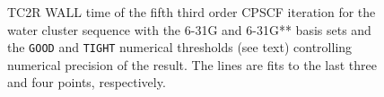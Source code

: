 \documentclass[prl,aps,twocolumn,showpacs,twocolumngrid,superbib]{revtex4}
\begin{document}
\begin{figure}[t]
  \caption{\protect
    TC2R WALL time of the fifth third order CPSCF iteration for
    the water cluster sequence with the 6-31G and 6-31G** 
    basis sets and the {\tt GOOD} and {\tt TIGHT} 
    numerical thresholds (see text) controlling numerical
    precision of the result. The lines are fits to the 
    last three and four points, respectively.
  }\label{fig:Gamma_TC2R_Timing}
\end{figure}
\end{document}
